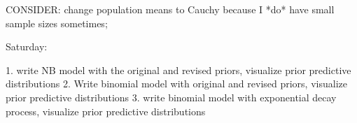 \documentclass[12pt, oneside, titlepage]{article}   	%
\begin{document}
CONSIDER: change population means to Cauchy because I *do* have small sample sizes sometimes; 

Saturday:

1. write NB model with the original and revised priors, visualize prior predictive distributions
2. Write binomial model with original and revised priors, visualize prior predictive distributions
3. write binomial model with exponential decay process, visualize prior predictive distributions





%



\end{document}
